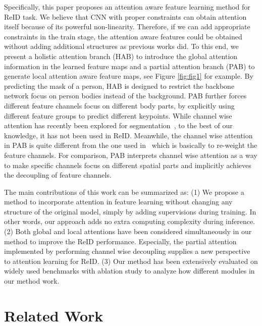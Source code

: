 \documentclass[10pt,twocolumn,letterpaper]{article}
\begin{document}
Specifically, this paper proposes an attention aware feature learning method for ReID task. We believe that CNN with proper constraints can obtain attention itself because of its powerful non-linearity. Therefore, if we can add appropriate constraints in the train stage, the attention aware features could be obtained without adding additional structures as previous works did. To this end, we present a holistic attention branch (HAB) to introduce the global attention information in the learned feature maps and a partial attention branch (PAB) to generate local attention aware feature maps, see Figure \ref{fig:fig1} for example. By predicting the mask of a person, HAB is designed to restrict the backbone network focus on person bodies instead of the background. PAB further forces different feature channels focus on different body parts, by explicitly using different feature groups  to predict different keypoints. While channel wise attention has recently been explored for segmentation~\cite{fu2019dual}, to the best of our knowledge, it has not been used in ReID. Meanwhile, the channel wise attention in PAB is quite different from the one used in~\cite{fu2019dual} which is basically to re-weight the feature channels. For comparison, PAB interprets channel wise attention as a way to make specific channels focus on different spatial parts and implicitly achieves the decoupling of feature channels.  




The main contributions of this work can be summarized as: (1) We propose a method to incorporate attention in feature learning without changing any structure of the original model, simply by adding supervisions during training. In other words, our approach adds no extra computing complexity during inference. (2) Both global and local attentions have been considered simultaneously in our method to improve the ReID performance. Especially, the partial attention implemented by performing channel wise decoupling supplies a new perspective to attention learning for ReID. (3) Our method has been extensively evaluated on widely used benchmarks with ablation study to analyze how different modules in our method work.



\section{Related Work}
\end{document}
